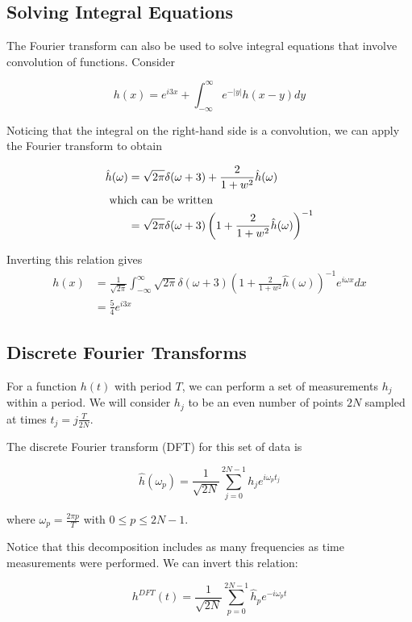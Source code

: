 \documentclass{../../physics_notes}
\newcommand{\intfty}{\int_{-\infty}^\infty}
\newcommand{\intF}[3]{\frac{1}{\sqrt{2\pi}}\intfty #1 e^{i#3#2}d#2}
\begin{document}
\subsection{Solving Integral Equations}

The Fourier transform can also be used to solve integral equations that involve convolution of functions. Consider

\[ h(x) = e^{i3x} + \intfty e^{-|y|}h(x-y)dy \]

Noticing that the integral on the right-hand side is a convolution, we can apply the Fourier transform to obtain

\begin{align*}
\hat{h}(\omega) &= \sqrt{2\pi} \delta(\omega + 3) + \frac{2}{1+w^2} \hat{h}(\omega) \\
\intertext{ which can be written }
&= \sqrt{2\pi} \delta(\omega + 3)\left(1 + \frac{2}{1+w^2} \hat{h}(\omega)\right)^{-1}
\end{align*}

Inverting this relation gives
\begin{align*}
h(x) &= \intF{\sqrt{2\pi} \delta(\omega + 3)\left(1 + \frac{2}{1+w^2} \hat{h}(\omega)\right)^{-1}}{x}{\omega} \\
&= \frac{5}{4}e^{i3x}
\end{align*}

\subsection{Discrete Fourier Transforms} 

For a function $h(t)$ with period $T$, we can perform a set of measurements $h_j$ within a period. We will consider $h_j$ to be an even number of points $2N$ sampled at times $t_j = j\frac{T}{2N}$.

The discrete Fourier transform (DFT) for this set of data is

\begin{equation}\label{eq:dft}
\hat{h}(\omega_p) = \frac{1}{\sqrt{2N}}\sum_{j=0}^{2N-1} h_j e^{i\omega_p t_j}
\end{equation}

where $\omega_p = \frac{2\pi p}{T}$ with $0 \leq p \leq 2N-1$.

Notice that this decomposition includes as many frequencies as time measurements were performed. We can invert this relation:

\begin{equation*}\label{eq:inv_dft}
h^{DFT}(t) = \frac{1}{\sqrt{2N}}\sum_{p=0}^{2N-1} \hat{h}_p e^{-i\omega_p t}
\end{equation*}
\end{document}
